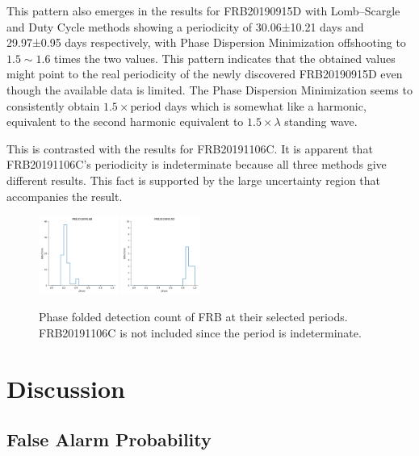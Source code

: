 \documentclass[reprint,amsmath,amssymb,showkeys,prd]{revtex4-2}
\begin{document}
This pattern also emerges in the results for FRB20190915D with Lomb--Scargle and Duty Cycle methods showing a periodicity of 30.06±10.21 days and 29.97±0.95 days respectively, with Phase Dispersion Minimization offshooting to $1.5\sim 1.6$ times the two values.
This pattern indicates that the obtained values might point to the real periodicity of the newly discovered FRB20190915D even though the available data is limited.
The Phase Dispersion Minimization seems to consistently obtain $1.5 \times \text{period}$ days which is somewhat like a harmonic, equivalent to the second harmonic equivalent to $1.5\times \lambda$ standing wave. 

This is contrasted with the results for FRB20191106C.
It is apparent that FRB20191106C's periodicity is indeterminate because all three methods give different results.
This fact is supported by the large uncertainty region that accompanies the result. 

\begin{figure}[ht]
    \label{fig-fold}    
    \caption{Phase folded detection count of FRB at their selected periods. FRB20191106C is not included since the period is indeterminate.}
    \centering
        \includegraphics[width=0.23\textwidth]{FRB20180916B-phase-16.33.png}
        \includegraphics[width=0.23\textwidth]{FRB20190915D-phase-30.06.png}
\end{figure}

\section{Discussion}

\subsection{False Alarm Probability}
\end{document}
